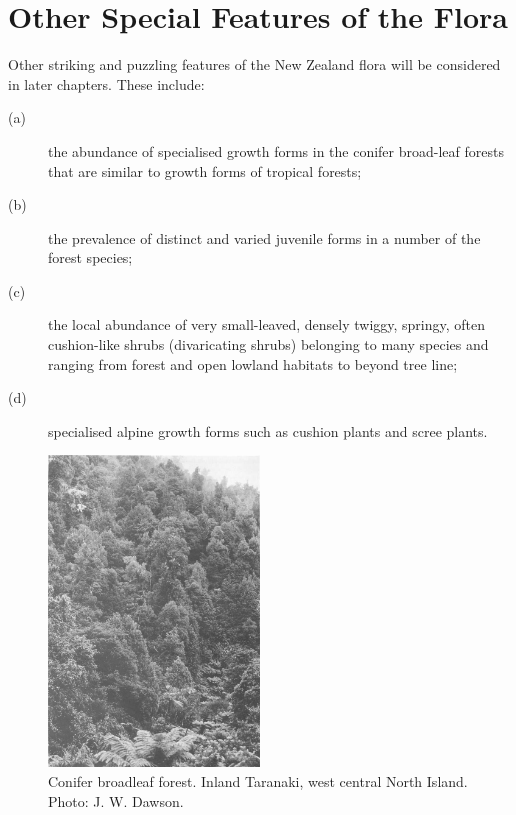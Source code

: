\section{Other Special Features of the Flora}

Other striking and puzzling features of the New Zealand flora will be considered in later chapters.
These include:

\begin{description}
\item[{(a)}]the abundance of specialised growth forms in the conifer broad-leaf forests that are similar to growth forms of tropical forests;
\item[{(b)}]the prevalence of distinct and varied juvenile forms in a number of the forest species;
\item[{(c)}]the local abundance of very small-leaved, densely twiggy, springy, often cushion-like shrubs (divaricating shrubs) belonging to many species and ranging from forest and open lowland habitats to beyond tree line;
\item[{(d)}]specialised alpine growth forms such as cushion plants and scree plants.
\end{description}

\begin{figure}
	\includegraphics[width=0.5\textwidth]{graphics/figure6conifer-broadleaf.jpg}
	\centering
	\caption[Conifer broadleaf forest, inland Taranaki]{Conifer broadleaf forest.
Inland Taranaki, west central North Island.
	Photo: J. W. Dawson.}%
	\label{fig:6conifer-broadleaf}
\end{figure}

